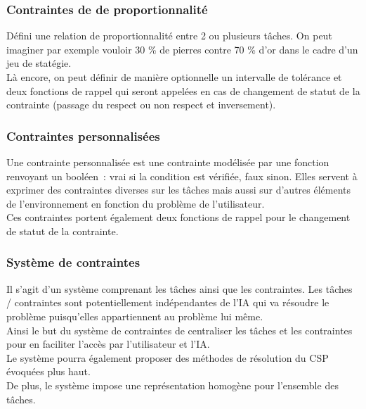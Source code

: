 \subsubsection*{Contraintes de de proportionnalité}

Défini une relation de proportionnalité entre 2 ou plusieurs tâches.
On peut imaginer par exemple vouloir 30 \% de pierres contre 70 \% d'or dans le cadre d'un jeu de statégie.\\
Là encore, on peut définir de manière optionnelle un intervalle de tolérance et deux fonctions de rappel qui seront appelées en cas de changement de statut de la contrainte (passage du respect ou non respect et inversement).

\subsubsection*{Contraintes personnalisées}

Une contrainte personnalisée est une contrainte modélisée par une fonction renvoyant un booléen~: vrai si la condition est vérifiée, faux sinon.
Elles servent à exprimer des contraintes diverses sur les tâches mais aussi sur d'autres éléments de l'environnement en fonction du problème de l'utilisateur.\\

Ces contraintes portent également deux fonctions de rappel pour le changement de statut de la contrainte.

\subsubsection*{Système de contraintes}
Il s'agit d'un système comprenant les tâches ainsi que les contraintes. Les  tâches / contraintes sont potentiellement indépendantes de l'IA qui va résoudre le problème puisqu'elles appartiennent au problème lui même.\\

Ainsi le but du système de contraintes de centraliser les tâches et les contraintes pour en faciliter l'accès par l'utilisateur et l'IA.\\
Le système pourra également proposer des méthodes de résolution du CSP évoquées plus haut.\\
De plus, le système impose une représentation homogène pour l'ensemble des tâches.\\

{\color{blue}{
\noindent Schéma de classes du système.\\
Schéma d’interaction avec l'utilisateur.\\
Schéma d’interaction avec l'IA.
}}


